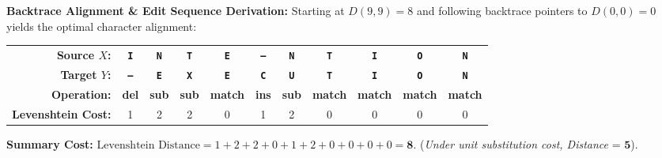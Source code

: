 \documentclass[10pt,a4paper]{article}
\newcommand{\rx}[1]{\texttt{\bfseries\color{inlinecode}#1}}
\begin{document}
\vspace{-1pt}
\begin{examplebox}
\footnotesize
\textbf{Backtrace Alignment \& Edit Sequence Derivation:}
\newline Starting at $D(9,9)=8$ and following backtrace pointers to $D(0,0)=0$ yields the optimal character alignment:
\begin{center}
\renewcommand{\arraystretch}{1.08}
\begin{tabular}{rcccccccccc}
\toprule
\textbf{Source $X$:} & \rx{I} & \rx{N} & \rx{T} & \rx{E} & \rx{--} & \rx{N} & \rx{T} & \rx{I} & \rx{O} & \rx{N} \\
\textbf{Target $Y$:} & \rx{--} & \rx{E} & \rx{X} & \rx{E} & \rx{C} & \rx{U} & \rx{T} & \rx{I} & \rx{O} & \rx{N} \\
\midrule
\textbf{Operation:} & \textcolor{accentred}{\textbf{del}} & \textcolor{themeblue}{\textbf{sub}} & \textcolor{themeblue}{\textbf{sub}} & \textcolor{accentgreen}{\textbf{match}} & \textcolor{accentgreen}{\textbf{ins}} & \textcolor{themeblue}{\textbf{sub}} & \textcolor{accentgreen}{\textbf{match}} & \textcolor{accentgreen}{\textbf{match}} & \textcolor{accentgreen}{\textbf{match}} & \textcolor{accentgreen}{\textbf{match}} \\
\textbf{Levenshtein Cost:} & 1 & 2 & 2 & 0 & 1 & 2 & 0 & 0 & 0 & 0 \\
\bottomrule
\end{tabular}
\end{center}
\vspace{-1pt}
\textbf{Summary Cost:} $\text{Levenshtein Distance} = 1 + 2 + 2 + 0 + 1 + 2 + 0 + 0 + 0 + 0 = \mathbf{8}$. \quad (\textit{Under unit substitution cost, Distance} = $\mathbf{5}$).
\end{examplebox}
\end{document}

